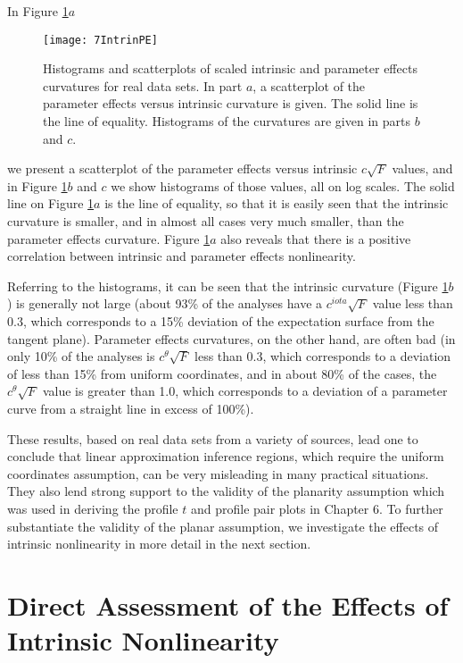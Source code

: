 In Figure \ref{fig:IntrinPE}$a$
\begin{figure}
  \texttt{[image: 7IntrinPE]}%
  \caption{\label{fig:IntrinPE}
  Histograms and scatterplots of scaled intrinsic and parameter
  effects curvatures for real data sets.  In part $a$, a scatterplot of
  the parameter effects versus intrinsic curvature is given.  The solid
  line is the line of equality.  Histograms of the curvatures are given
  in parts $b$ and $c$.}
\end{figure}
we present a scatterplot of the parameter
effects versus intrinsic $c \sqrt F$ values, and in
Figure \ref{fig:IntrinPE}$b$ and $c$
we show histograms of those values, all on log scales.
The solid line on Figure \ref{fig:IntrinPE}$a$ is the line of equality,
so that it is easily seen that the
intrinsic curvature is smaller, and in almost all cases very
much smaller, than the parameter effects curvature.
Figure \ref{fig:IntrinPE}$a$ also reveals that there is a positive
correlation between intrinsic and parameter effects nonlinearity.

Referring to the histograms,
it can be seen that the intrinsic curvature (Figure \ref{fig:IntrinPE}$b$)
is generally not large (about 93\% of the analyses have a
$c^{iota} \sqrt F $ value less than 0.3, which corresponds to
a 15\% deviation of the expectation surface from the
tangent plane).
Parameter effects curvatures, on the other hand, are often
bad (in only 10\% of the analyses is $c^{\theta} \sqrt F$ less than
0.3, which corresponds to a
deviation of less than 15\% from uniform coordinates,
and in about 80\% of the cases, the $c^{\theta} \sqrt F$ value is greater
than 1.0, which corresponds to a
deviation of a parameter curve from a straight line in excess of
100\%).

These results, based on real data sets from a variety of
sources, lead one to conclude that linear approximation
inference regions, which require the uniform coordinates assumption,
can be very misleading in many practical situations.
They also lend strong support to the validity of the
planarity assumption which was used in deriving the
profile $t$ and profile pair plots in Chapter 6.
To further substantiate the validity of the planar
assumption, we investigate the effects of intrinsic nonlinearity
in more detail in the next section.

\section{Direct Assessment of the Effects of Intrinsic Nonlinearity}

